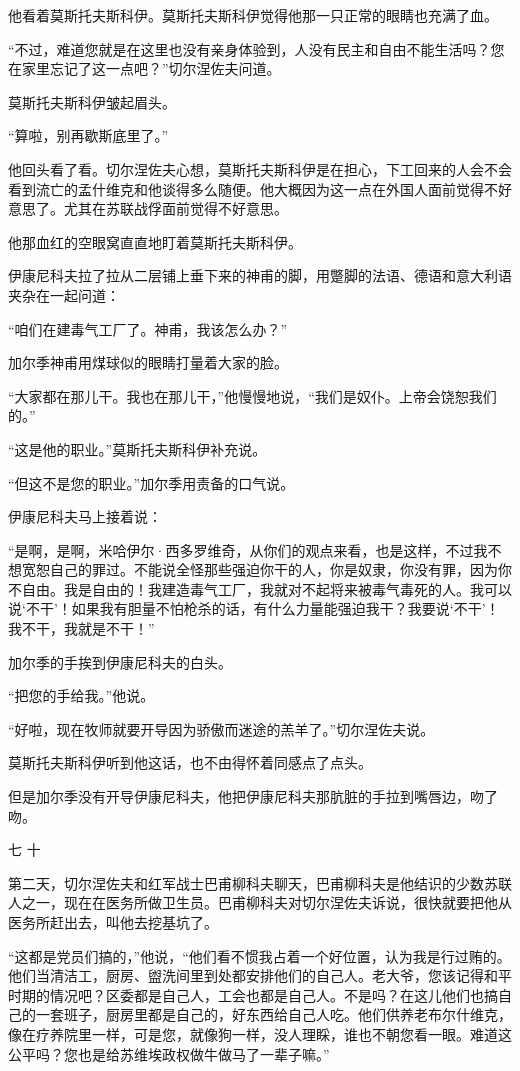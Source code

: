 他看着莫斯托夫斯科伊。莫斯托夫斯科伊觉得他那一只正常的眼睛也充满了血。

“不过，难道您就是在这里也没有亲身体验到，人没有民主和自由不能生活吗？您在家里忘记了这一点吧？”切尔涅佐夫问道。

莫斯托夫斯科伊皱起眉头。

“算啦，别再歇斯底里了。”

他回头看了看。切尔涅佐夫心想，莫斯托夫斯科伊是在担心，下工回来的人会不会看到流亡的孟什维克和他谈得多么随便。他大概因为这一点在外国人面前觉得不好意思了。尤其在苏联战俘面前觉得不好意思。

他那血红的空眼窝直直地盯着莫斯托夫斯科伊。

伊康尼科夫拉了拉从二层铺上垂下来的神甫的脚，用蹩脚的法语、德语和意大利语夹杂在一起问道：

“咱们在建毒气工厂了。神甫，我该怎么办？”

加尔季神甫用煤球似的眼睛打量着大家的脸。

“大家都在那儿干。我也在那儿干，”他慢慢地说，“我们是奴仆。上帝会饶恕我们的。”

“这是他的职业。”莫斯托夫斯科伊补充说。

“但这不是您的职业。”加尔季用责备的口气说。

伊康尼科夫马上接着说：

“是啊，是啊，米哈伊尔·西多罗维奇，从你们的观点来看，也是这样，不过我不想宽恕自己的罪过。不能说全怪那些强迫你干的人，你是奴隶，你没有罪，因为你不自由。我是自由的！我建造毒气工厂，我就对不起将来被毒气毒死的人。我可以说‘不干’！如果我有胆量不怕枪杀的话，有什么力量能强迫我干？我要说‘不干’！我不干，我就是不干！”

加尔季的手挨到伊康尼科夫的白头。

“把您的手给我。”他说。

“好啦，现在牧师就要开导因为骄傲而迷途的羔羊了。”切尔涅佐夫说。

莫斯托夫斯科伊听到他这话，也不由得怀着同感点了点头。

但是加尔季没有开导伊康尼科夫，他把伊康尼科夫那肮脏的手拉到嘴唇边，吻了吻。

七 十

第二天，切尔涅佐夫和红军战士巴甫柳科夫聊天，巴甫柳科夫是他结识的少数苏联人之一，现在在医务所做卫生员。巴甫柳科夫对切尔涅佐夫诉说，很快就要把他从医务所赶出去，叫他去挖基坑了。

“这都是党员们搞的，”他说，“他们看不惯我占着一个好位置，认为我是行过贿的。他们当清洁工，厨房、盥洗间里到处都安排他们的自己人。老大爷，您该记得和平时期的情况吧？区委都是自己人，工会也都是自己人。不是吗？在这儿他们也搞自己的一套班子，厨房里都是自己的，好东西给自己人吃。他们供养老布尔什维克，像在疗养院里一样，可是您，就像狗一样，没人理睬，谁也不朝您看一眼。难道这公平吗？您也是给苏维埃政权做牛做马了一辈子嘛。”

